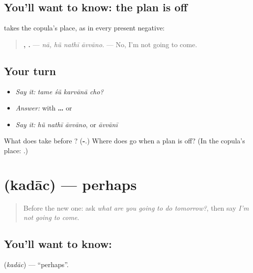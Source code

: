 \subsection*{You'll want to know: the plan is off}
\textbf{} takes the copula's place, as in every present negative:

\begin{quote}
\textbf{,   .} — \emph{nā, hũ nathī āvvāno.} — No, I'm not going to come.
\end{quote}

\subsection*{Your turn}
\begin{itemize}
\raggedright
  \item \emph{Say it:} \emph{tame śũ karvānā cho?}
  \item \emph{Answer:} with \textbf{ …  } or \textbf{ }
  \item \emph{Say it:} \emph{hũ nathī āvvāno}, or \emph{āvvānī}
\end{itemize}

\begin{tcolorbox}[breakable,colback=teal!4,colframe=teal!35!black,title={Before you move on}]
What does \textbf{} take before \textbf{}? (\textbf{-}.) Where does \textbf{} go when a plan is off? (In the copula's place: \textbf{  }.)
\end{tcolorbox}
\section[\texorpdfstring{\gu{કદાચ} (kadāc)}{કદાચ (kadāc)}]{ (kadāc) — perhaps}

\label{lesson:GU-C150-kadach}



\begin{quote}
Before the new one: ask \emph{what are you going to do tomorrow?}, then say \emph{I'm not going to come}.
\end{quote}

\subsection*{You'll want to know: }
\textbf{} (\emph{kadāc}) — \textquotedblleft{}perhaps\textquotedblright{}.

